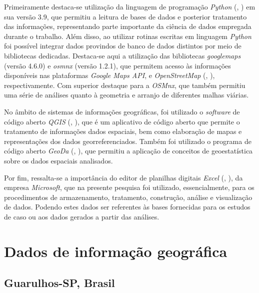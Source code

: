 Primeiramente destaca-se utilização da linguagem de programação \textit{Python} (, \citeyear{van1995python}) em sua versão 3.9, que permitiu a leitura de bases de dados e posterior tratamento das informações, representando parte importante da ciência de dados empregada durante o trabalho.
%
Além disso, ao utilizar rotinas escritas em linguagem \textit{Python} foi possível integrar dados provindos de banco de dados distintos por meio de bibliotecas dedicadas.
%
Destaca-se aqui a utilização das bibliotecas \textit{googlemaps} (versão 4.6.0) e \textit{osmnx} (versão 1.2.1), que permitem acesso às informações disponíveis nas plataformas \textit{Google Maps API}, e \textit{OpenStreetMap} (, \citeyear{OpenStreetMap}), respectivamente.
Com superior destaque para a \textit{OSMnx}, que também permitiu uma série de análises quanto à geometria e arranjo de diferentes malhas viárias.

No âmbito de sistemas de informações geográficas, foi utilizado o \textit{software} de código aberto \textit{QGIS} (, \citeyear{QGIS_software}), que é um aplicativo de código aberto que permite o tratamento de informações dados espaciais, bem como elaboração de mapas e representações dos dados georreferenciados.
Também foi utilizado o programa de código aberto \textit{GeoDa} (, \citeyear{anselin2010geoda}), que permitiu a aplicação de conceitos de geoestatística sobre os dados espaciais analisados.
 
Por fim, ressalta-se a importância do editor de planilhas digitais \textit{Excel} (, \citeyear{msexcel}), da empresa \textit{Microsoft}, que na presente pesquisa foi utilizado, essencialmente, para os procedimentos de armazenamento, tratamento, construção, análise e visualização de dados. 
Podendo estes dados ser referentes às bases fornecidas para os estudos de caso ou aos dados gerados a partir das análises. 

\section{Dados de informação geográfica} \label{sec:dados_de_informacao_geografica}

\subsection{Guarulhos-SP, Brasil} \label{sec:georef_guarulhos}


